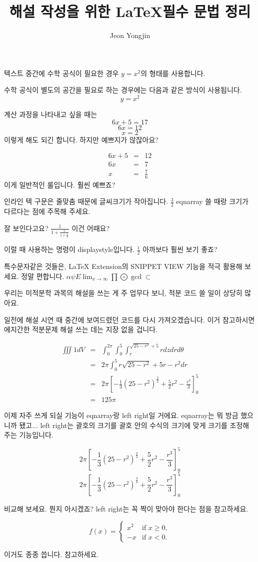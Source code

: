 \documentclass{article}
\author{Jeon Yongjin}
\title{해설 작성을 위한 \LaTeX 필수 문법 정리}
\date{}
\begin{document}
\maketitle

텍스트 중간에 수학 공식이 필요한 경우 \( y=x^2 \)의 형태를 사용합니다.

수학 공식이 별도의 공간을 필요로 하는 경우에는 다음과 같은 방식이 사용됩니다. \[ y=x^2 \]

계산 과정을 나타내고 싶을 때는
\[6x + 5 = 17\]
\[6x = 12\]
\[x = 2\]
이렇게 해도 되긴 합니다. 하지만 예쁘지가 않잖아요?

\begin{eqnarray*}
    6x + 5 &=& 12 \\
    6x &=& 7 \\
    x &=& \frac{7}{6}
\end{eqnarray*}
이게 일반적인 룰입니다. 훨씬 예쁘죠?

인라인 텍 구문은 줄맞춤 때문에 글씨크기가 작아집니다. \( \frac{3}{2} \) eqnarray 쓸 때랑 크기가 다르다는 점에 주목해 주세요.

잘 보인다고요? \(\frac{1}{1+\frac{1}{1+\frac{1}{2}}}\) 이건 어때요?

이럴 때 사용하는 명령이 displaystyle입니다. \( \displaystyle \frac{1}{2} \) 아까보다 훨씬 보기 좋죠?

특수문자같은 것들은, LaTeX Extension의 SNIPPET VIEW 기능을 적극 활용해 보세요. 정말 편합니다.
\(\alpha \psi E \lim_{x \to \infty} \prod \bigodot \gcd \subset \)

우리는 미적분학 과목의 해설을 쓰는 게 주 업무다 보니, 적분 코드 쓸 일이 상당히 많아요.

일전에 해설 시연 때 중간에 보여드렸던 코드를 다시 가져오겠습니다. 이거 참고하시면 에지간한 적분문제 해설 쓰는 데는 지장 없을 겁니다.

\begin{eqnarray*}
    \iiint 1 dV &=& \int_{0}^{2\pi} \int_{0}^{5} \int_{r}^{\sqrt{25-r^2}+5} r dz dr d\theta \\
    &=& 2\pi \int_{0}^{5} r\sqrt{25-r^2} + 5r -r^2 dr \\
    &=& 2\pi \left[ -\frac{1}{3}(25-r^2)^{\frac{3}{2}} + \frac{5}{2}r^2 - \frac{r^3}{3} \right]_{0}^{5} \\
    &=& 125\pi
\end{eqnarray*}

이제 자주 쓰게 되실 기능이 eqnarray랑 left right일 거에요. eqnarray는 뭐 방금 했으니까 됐고...
left right는 괄호의 크기를 괄호 안의 수식의 크기에 맞게 크기를 조정해 주는 기능입니다.
    
\[ 2\pi [-\frac{1}{3}(25-r^2)^{\frac{3}{2}} + \frac{5}{2}r^2 - \frac{r^3}{3}]_{0}^{5} \]
\[ 2\pi \left[ -\frac{1}{3}(25-r^2)^{\frac{3}{2}} + \frac{5}{2}r^2 - \frac{r^3}{3} \right]_{0}^{5} \]

비교해 보세요. 뭔지 아시겠죠?
left right는 꼭 짝이 맞아야 한다는 점을 참고하세요.

\[
f(x) =
\begin{cases} 
x^2 & \text{if } x \geq 0, \\
-x  & \text{if } x < 0.
\end{cases}
\]

이거도 종종 씁니다. 참고하세요.
\end{document}
